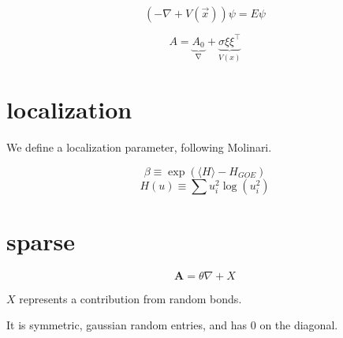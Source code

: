 \documentclass{article}
\begin{document}
\begin{equation}
	\left( -\nabla + V(\vec{x})\right) \psi = E\psi
\end{equation}

\begin{equation}
	A = \underbrace{A_0}_{\nabla} + \underbrace{\sigma\xi \xi^\intercal}_{V(x)}
\end{equation}

\section{localization}%
\label{sec:localization}

We define a localization parameter, following Molinari.

\begin{equation}
	\beta \equiv \exp{\left( \langle H \rangle - H_{GOE} \right)}
\end{equation}
\begin{equation}
	H \left( u \right)\equiv \sum u_i ^2 \log{\left( u_i^2 \right)}
\end{equation}

\section{sparse}%
\label{sec:sparse}

\begin{equation}
	\boldsymbol{A} = \theta \nabla + X
\end{equation}

$X$ represents a contribution from random bonds. 

It is symmetric, gaussian random entries, and has 0 on the diagonal.
\end{document}

